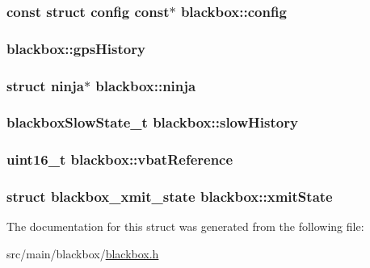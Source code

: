 \hypertarget{structblackbox_ae4db1da551d96d8041d5d57300b08ef9}{
\subsubsection[{config}]{\setlength{\rightskip}{0pt plus 5cm}const struct {\bf config} const$\ast$ blackbox\+::config}}\label{structblackbox_ae4db1da551d96d8041d5d57300b08ef9}
\hypertarget{structblackbox_a8a9a1274f52bbbb99aa7df75cc4dc174}{
\subsubsection[{gps\+History}]{ blackbox\+::gps\+History}}\label{structblackbox_a8a9a1274f52bbbb99aa7df75cc4dc174}
\hypertarget{structblackbox_ad1ca28ccce2a76596368f3ce76abc3cf}{
\subsubsection[{ninja}]{\setlength{\rightskip}{0pt plus 5cm}struct {\bf ninja}$\ast$ blackbox\+::ninja}}\label{structblackbox_ad1ca28ccce2a76596368f3ce76abc3cf}
\hypertarget{structblackbox_a187e0091150ef4dddc850cd94c899b33}{
\subsubsection[{slow\+History}]{\setlength{\rightskip}{0pt plus 5cm}blackbox\+Slow\+State\+\_\+t blackbox\+::slow\+History}}\label{structblackbox_a187e0091150ef4dddc850cd94c899b33}
\hypertarget{structblackbox_a902deabb52e9aa85f6002b40c99fd503}{
\subsubsection[{vbat\+Reference}]{\setlength{\rightskip}{0pt plus 5cm}uint16\+\_\+t blackbox\+::vbat\+Reference}}\label{structblackbox_a902deabb52e9aa85f6002b40c99fd503}
\hypertarget{structblackbox_ad774334afdeef330f56edbbb69755c0b}{
\subsubsection[{xmit\+State}]{\setlength{\rightskip}{0pt plus 5cm}struct {\bf blackbox\+\_\+xmit\+\_\+state} blackbox\+::xmit\+State}}\label{structblackbox_ad774334afdeef330f56edbbb69755c0b}


The documentation for this struct was generated from the following file\+:\begin{DoxyCompactItemize}
\item 
src/main/blackbox/\hyperlink{blackbox_2blackbox_8h}{blackbox.\+h}\end{DoxyCompactItemize}
